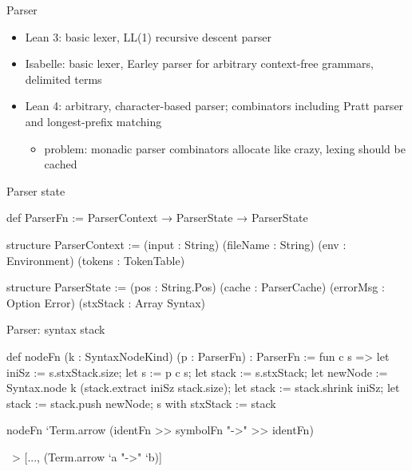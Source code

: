 \documentclass[t]{beamer}
\begin{document}
\begin{frame}{Parser}
  \begin{itemize}
  \item Lean 3: basic lexer, LL(1) recursive descent parser
  \item Isabelle: basic lexer, Earley parser for arbitrary context-free grammars, delimited terms
    \pause
  \item Lean 4: arbitrary, character-based parser; combinators including Pratt
    parser and longest-prefix matching
    \pause
    \begin{itemize}
    \item problem: monadic parser combinators allocate like crazy, lexing should
      be cached
    \end{itemize}
  \end{itemize}
\end{frame}

\begin{frame}[fragile]{Parser state}
\begin{leancode}
def ParserFn := ParserContext → ParserState → ParserState

structure ParserContext :=
(input    : String)
(fileName : String)
(env      : Environment)
(tokens   : TokenTable)

structure ParserState :=
(pos      : String.Pos)
(cache    : ParserCache)
(errorMsg : Option Error)
(stxStack : Array Syntax)
\end{leancode}
\end{frame}

\begin{frame}{Parser: syntax stack}
\begin{leancode}
def nodeFn (k : SyntaxNodeKind) (p : ParserFn) : ParserFn :=
fun c s =>
  let iniSz := s.stxStack.size;
  let s     := p c s;
  let stack := s.stxStack;
  let newNode := Syntax.node k (stack.extract iniSz stack.size);
  let stack   := stack.shrink iniSz;
  let stack   := stack.push newNode;
  { s with stxStack := stack }
\end{leancode}
  
\begin{leancode}
nodeFn `Term.arrow (identFn >> symbolFn "->" >> identFn)
\end{leancode}

\begin{leancode}
   [..., `a, "->", `b]
~> [..., (Term.arrow `a "->" `b)]
\end{leancode}
\end{frame}
\end{document}

